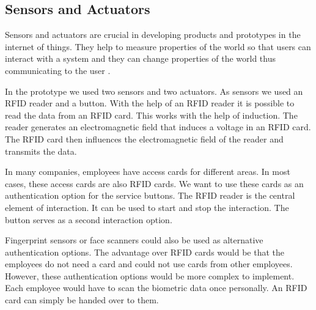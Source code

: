\subsection{Sensors and Actuators}
\label{sec:Technologies:Sensors-Actuators}


Sensors and actuators are crucial in developing products and prototypes in the internet of things. They help to measure properties of the world so that users can interact with a system and they can change properties of the world thus communicating to the user \cite{ISO:20924:2018}.

In the prototype we used two sensors and two actuators. As sensors we used an RFID reader and a button. With the help of an RFID reader it is possible to read the data from an RFID card. This works with the help of induction. The reader generates an electromagnetic field that induces a voltage in an RFID card. The RFID card then influences the electromagnetic field of the reader and transmits the data. \cite{Adryan:TechFound-Components:2017}

In many companies, employees have access cards for different areas. In most cases, these access cards are also RFID cards. We want to use these cards as an authentication option for the service buttons. The RFID reader is the central element of interaction. It can be used to start and stop the interaction. The button serves as a second interaction option.

Fingerprint sensors or face scanners could also be used as alternative authentication options. The advantage over RFID cards would be that the employees do not need a card and could not use cards from other employees. However, these authentication options would be more complex to implement. Each employee would have to scan the biometric data once personally. An RFID card can simply be handed over to them. 

